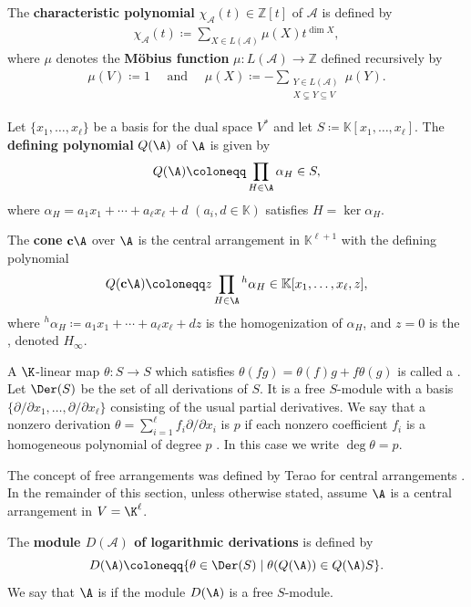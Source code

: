 The \textbf{characteristic polynomial} $ \chi_{\mathcal{A}}(t) \in \mathbb{Z}[t] $ of $ \mathcal{A} $ is defined by
\begin{align*}
\chi_{\mathcal{A}}(t)  \coloneqq \sum_{X \in L(\mathcal{A})}\mu(X)t^{\dim X}, 
\end{align*}
where $ \mu $ denotes the \textbf{M\"{o}bius function} $ \mu \colon L(\mathcal{A}) \to \mathbb{Z} $ defined recursively by 
\begin{align*}
\mu\left( V \right)  \coloneqq 1 
\quad \text{ and } \quad 
\mu(X)  \coloneqq -\sum_{\substack{Y \in L(\mathcal{A}) \\ X \subsetneq Y  \subseteq V}}\mu(Y). 
\end{align*}

Let $ \{x_{1}, \dots, x_{\ell}\} $ be a basis for the dual space $V^{\ast} $ and let $ S  \coloneqq \mathbb{K}[x_{1}, \dots, x_{\ell}] $. 
The \textbf{defining polynomial} $Q(\A)$ of $\A$ is given by
$$Q(\A) \coloneqq \prod_{H \in \A} \alpha_H \in S,$$
where $ \alpha_H=a_1x_1+\cdots+a_\ell x_\ell+d$  $(a_i, d \in \mathbb{K})$ satisfies $H = \ker \alpha_H$. 


The \textbf{cone} $ \textbf{c}\A$ over $\A$ is the central arrangement in $\mathbb{K}^{\ell+1}$ with the defining polynomial
$$Q(\textbf{c}\A) \coloneqq z\prod_{H \in \A} {}^h\alpha_H \in \mathbb{K}[x_1,\ldots, x_\ell,z],$$
where $ {}^h\alpha_H \coloneqq a_1x_1+\cdots+a_\ell x_\ell+dz$ is the homogenization of $\alpha_H$, and $z=0$ is the , denoted $H_{\infty}$. 

A $\K$-linear map $\theta:S\to S$ which satisfies $\theta(fg) = \theta(f)g + f\theta(g)$ is called a .
Let $\Der(S)$ be the set of all derivations of $S$. 
It is a free $S$-module with a basis $\{\partial/\partial x_1,\ldots,\partial/\partial x_{\ell}\}$ consisting of the usual partial derivatives.
We say that a nonzero derivation $\theta  = \sum_{i=1}^\ell f_i \partial/\partial x_{i}$  is  $p$ if each nonzero coefficient $f_i$ is a homogeneous polynomial of degree $p$ \cite[Definition 4.2]{OT92}.
In this case we write $\deg{\theta} = p$.

The concept of free arrangements was defined by Terao for central arrangements \cite{T80}. 
In the remainder of this section, unless otherwise stated, assume $\A$ is a central arrangement in  $V=\K^\ell$. 
\begin{definition}\label{def:free-arr}
The \textbf{module $D(\mathcal{A}) $ of logarithmic derivations}  is defined by 
	\begin{equation*}
	D(\A)  \coloneqq  \{ \theta \in \Der(S) \mid \theta(Q(\A)) \in Q(\A)S\}.
	\end{equation*}
	We say that $\A$ is  if the module $D(\A)$ is a free $S$-module. 
\end{definition}


